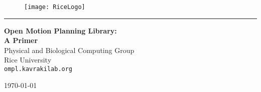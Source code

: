 \begin{titlepage}

\begin{center}



\begin {figure}
\centering
\texttt{[image: RiceLogo]}
\end{figure}
\vspace {0.25in} 
\rule{\linewidth}{0.1mm}
\vspace {0.25in}

{ \huge \bfseries Open Motion Planning Library:\\ A Primer}
\\ [0.50in]
{\Large Physical and Biological Computing Group\\
Rice University
}
\\ [0.1in]
{\tt ompl.kavrakilab.org}


\vfill

{\large \today}

\end{center}

\end{titlepage}
